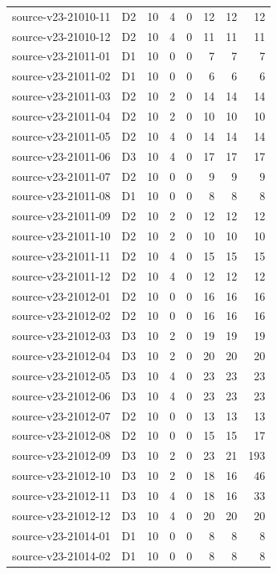 \begin{longtable}{p{}lrrrrrr}
source-v23-21010-11 & D2 & 10 & 4 & 0 & 12 & 12 & 12\\
source-v23-21010-12 & D2 & 10 & 4 & 0 & 11 & 11 & 11\\
source-v23-21011-01 & D1 & 10 & 0 & 0 & 7 & 7 & 7\\
source-v23-21011-02 & D1 & 10 & 0 & 0 & 6 & 6 & 6\\
source-v23-21011-03 & D2 & 10 & 2 & 0 & 14 & 14 & 14\\
source-v23-21011-04 & D2 & 10 & 2 & 0 & 10 & 10 & 10\\
source-v23-21011-05 & D2 & 10 & 4 & 0 & 14 & 14 & 14\\
source-v23-21011-06 & D3 & 10 & 4 & 0 & 17 & 17 & 17\\
source-v23-21011-07 & D2 & 10 & 0 & 0 & 9 & 9 & 9\\
source-v23-21011-08 & D1 & 10 & 0 & 0 & 8 & 8 & 8\\
source-v23-21011-09 & D2 & 10 & 2 & 0 & 12 & 12 & 12\\
source-v23-21011-10 & D2 & 10 & 2 & 0 & 10 & 10 & 10\\
source-v23-21011-11 & D2 & 10 & 4 & 0 & 15 & 15 & 15\\
source-v23-21011-12 & D2 & 10 & 4 & 0 & 12 & 12 & 12\\
source-v23-21012-01 & D2 & 10 & 0 & 0 & 16 & 16 & 16\\
source-v23-21012-02 & D2 & 10 & 0 & 0 & 16 & 16 & 16\\
source-v23-21012-03 & D3 & 10 & 2 & 0 & 19 & 19 & 19\\
source-v23-21012-04 & D3 & 10 & 2 & 0 & 20 & 20 & 20\\
source-v23-21012-05 & D3 & 10 & 4 & 0 & 23 & 23 & 23\\
source-v23-21012-06 & D3 & 10 & 4 & 0 & 23 & 23 & 23\\
source-v23-21012-07 & D2 & 10 & 0 & 0 & 13 & 13 & 13\\
source-v23-21012-08 & D2 & 10 & 0 & 0 & 15 & 15 & 17\\
source-v23-21012-09 & D3 & 10 & 2 & 0 & 23 & 21 & 193\\
source-v23-21012-10 & D3 & 10 & 2 & 0 & 18 & 16 & 46\\
source-v23-21012-11 & D3 & 10 & 4 & 0 & 18 & 16 & 33\\
source-v23-21012-12 & D3 & 10 & 4 & 0 & 20 & 20 & 20\\
source-v23-21014-01 & D1 & 10 & 0 & 0 & 8 & 8 & 8\\
source-v23-21014-02 & D1 & 10 & 0 & 0 & 8 & 8 & 8\\

\end{longtable}
